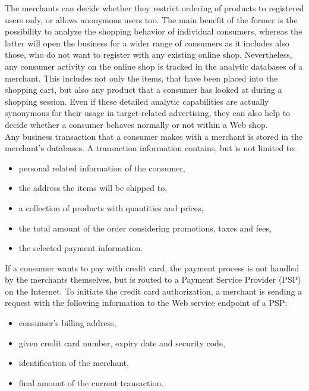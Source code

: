 The merchants can decide whether they restrict ordering of products to registered users only, or allows anonymous users too. The main benefit of the former is the possibility to analyze the shopping behavior of individual consumers, whereas the latter will open the business for a wider range of consumers as it includes also those, who do not want to register with any existing online shop. Nevertheless, any consumer activity on the online shop is tracked in the analytic databases of a merchant. This includes not only the items, that have been placed into the shopping cart, but also any product that a consumer has looked at during a shopping session. Even if these detailed analytic capabilities are actually synonymous for their usage in target-related advertising, they can also help to decide whether a consumer behaves normally or not within a Web shop. \\

Any business transaction that a consumer makes with a merchant is stored in the merchant's databases. A transaction information contains, but is not limited to:\@

\begin{itemize}
		\item personal related information of the consumer,
		\item the address the items will be shipped to,
		\item a collection of products with quantities and prices,
		\item the total amount of the order considering promotions, taxes and fees,
		\item the selected payment information.
\end{itemize}

If a consumer wants to pay with credit card, the payment process is not handled by the merchants themselves, but is routed to a Payment Service Provider (\gls{PSP}) on the Internet. To initiate the credit card authorization, a merchant is sending a request with the following information to the Web service endpoint of a \gls{PSP}: \@

\begin{itemize}
    \item consumer's billing address,
    \item given credit card number, expiry date and security code,
    \item identification of the merchant,
    \item final amount of the current transaction.
\end{itemize}

